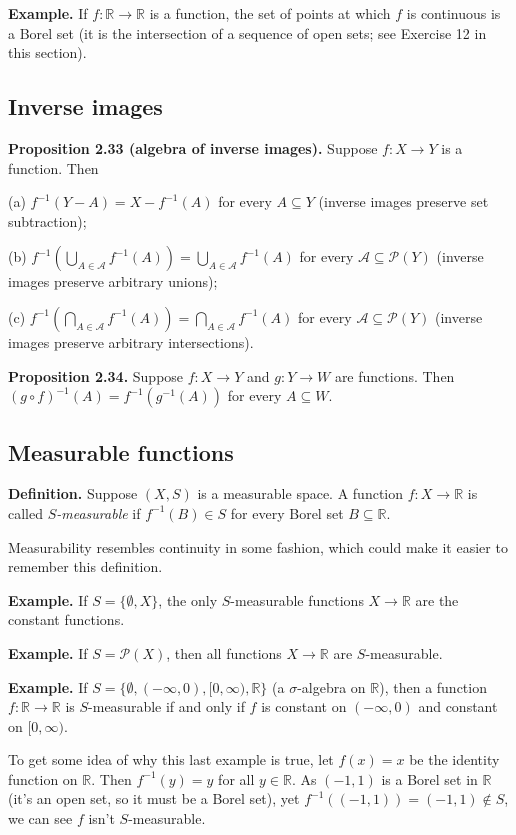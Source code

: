 \documentclass[a4paper]{article}
\newcommand{\R}{\mathbb{R}}
\begin{document}
\textbf{Example.} If $f : \R \to \R$ is a function, the set of points at which $f$ is continuous is a Borel set (it is the intersection of a sequence of open sets; see Exercise 12 in this section).

\subsection{Inverse images}

\textbf{Proposition 2.33 (algebra of inverse images).} Suppose $f : X \to Y$ is a function. Then

(a) $f^{-1}(Y - A) = X - f^{-1}(A)$ for every $A \subseteq Y$ (inverse images preserve set subtraction);

(b) $f^{-1}\left(\bigcup_{A \in \mathcal{A}} f^{-1}(A)\right) = \bigcup_{A \in \mathcal{A}} f^{-1}(A)$ for every $\mathcal{A} \subseteq \mathcal{P}(Y)$ (inverse images preserve arbitrary unions);

(c) $f^{-1}\left(\bigcap_{A \in \mathcal{A}} f^{-1}(A)\right) = \bigcap_{A \in \mathcal{A}} f^{-1}(A)$ for every $\mathcal{A} \subseteq \mathcal{P}(Y)$ (inverse images preserve arbitrary intersections).

\textbf{Proposition 2.34.} Suppose $f : X \to Y$ and $g : Y \to W$ are functions. Then $(g \circ f)^{-1}(A) = f^{-1}(g^{-1}(A))$ for every $A \subseteq W$.

\subsection{Measurable functions}

\textbf{Definition.} Suppose $(X, S)$ is a measurable space. A function $f : X \to \R$ is called \emph{$S$-measurable} if $f^{-1}(B) \in S$ for every Borel set $B \subseteq \R$.

Measurability resembles continuity in some fashion, which could make it easier to remember this definition.

\textbf{Example.} If $S = \{\emptyset, X\}$, the only $S$-measurable functions $X \to \R$ are the constant functions.

\textbf{Example.} If $S = \mathcal{P}(X)$, then all functions $X \to \R$ are $S$-measurable.

\textbf{Example.} If $S = \{\emptyset, (-\infty, 0), [0, \infty), \R\}$ (a $\sigma$-algebra on $\R$), then a function $f : \R \to \R$ is $S$-measurable if and only if $f$ is constant on $(-\infty, 0)$ and constant on $[0, \infty)$.

To get some idea of why this last example is true, let $f(x) = x$ be the identity function on $\R$. Then $f^{-1}(y) = y$ for all $y \in \R$. As $(-1, 1)$ is a Borel set in $\R$ (it's an open set, so it must be a Borel set), yet $f^{-1}((-1, 1)) = (-1, 1) \notin S$, we can see $f$ isn't $S$-measurable.
\end{document}
